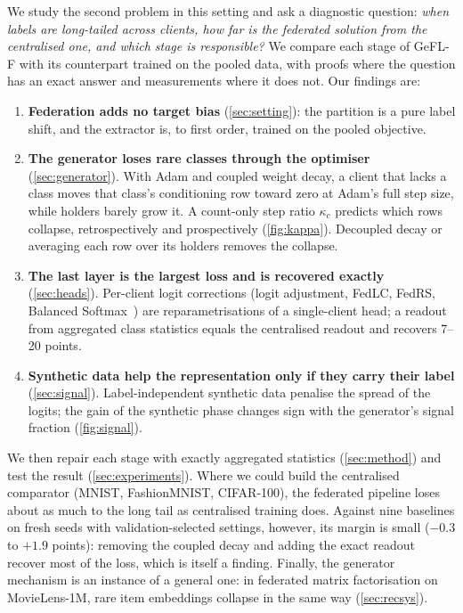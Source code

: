 \documentclass[10pt]{article}
\theoremstyle{plain}
\theoremstyle{definition}
\begin{document}
We study the second problem in this setting and ask a diagnostic question: \emph{when labels are long-tailed across
clients, how far is the federated solution from the centralised one, and which stage is responsible?} We compare each
stage of GeFL-F with its counterpart trained on the pooled data, with proofs where the question has an exact answer and
measurements where it does not. Our findings are:
\begin{enumerate}
\item \textbf{Federation adds no target bias} (\cref{sec:setting}): the partition is a pure label shift, and the
extractor is, to first order, trained on the pooled objective.
\item \textbf{The generator loses rare classes through the optimiser} (\cref{sec:generator}). With Adam and coupled
weight decay, a client that lacks a class moves that class's conditioning row toward zero at Adam's full step size,
while holders barely grow it. A count-only step ratio $\kappa_c$ predicts which rows collapse, retrospectively and
prospectively (\cref{fig:kappa}). Decoupled decay or averaging each row over its holders removes the collapse.
\item \textbf{The last layer is the largest loss and is recovered exactly} (\cref{sec:heads}). Per-client logit
corrections (logit adjustment, FedLC, FedRS, Balanced Softmax~\cite{ren2020bsm}) are reparametrisations of a single-client head; a
readout from aggregated class statistics equals the centralised readout and recovers 7--20 points.
\item \textbf{Synthetic data help the representation only if they carry their label} (\cref{sec:signal}).
Label-independent synthetic data penalise the spread of the logits; the gain of the synthetic phase changes sign with
the generator's signal fraction (\cref{fig:signal}).
\end{enumerate}
We then repair each stage with exactly aggregated statistics (\cref{sec:method}) and test the result
(\cref{sec:experiments}). Where we could build the centralised comparator (MNIST, FashionMNIST, CIFAR-100), the
federated pipeline loses about as much to the long tail as centralised training does. Against nine baselines on fresh
seeds with validation-selected settings, however, its margin is small ($-0.3$ to $+1.9$ points): removing the coupled
decay and adding the exact readout recover most of the loss, which is itself a finding. Finally, the generator
mechanism is an instance of a general one: in federated matrix factorisation on MovieLens-1M, rare item embeddings
collapse in the same way (\cref{sec:recsys}).
\end{document}
